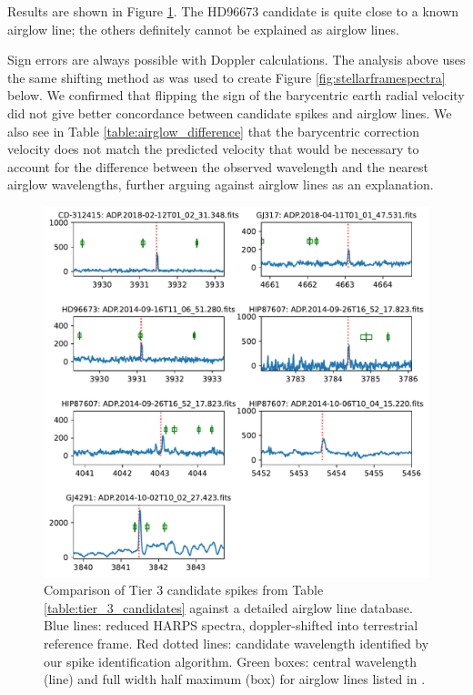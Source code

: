 \documentclass[twocolumn]{aastex701}
\begin{document}
Results are shown in Figure \ref{fig:airglow_reanalysis}. The HD96673 candidate is quite close to a known airglow line; the others definitely cannot be explained as airglow lines.

Sign errors are always possible with Doppler calculations.  The analysis above uses the same shifting method as was used to create Figure \ref{fig:stellarframespectra} below.  We confirmed that flipping the sign of the barycentric earth radial velocity did not give better concordance between candidate spikes and airglow lines. We also see in Table \ref{table:airglow_difference} that the barycentric correction velocity does not match the predicted velocity that would be necessary to account for the difference between the observed wavelength and the nearest airglow wavelengths, further arguing against airglow lines as an explanation.

\begin{figure}
    \centering  \includegraphics[width=\textwidth]{airglow_reanalysis.pdf}
    \caption{Comparison of Tier 3 candidate spikes from Table \ref{table:tier_3_candidates} against a detailed airglow line database.  Blue lines: reduced HARPS spectra, doppler-shifted into terrestrial reference frame.  Red dotted lines: candidate wavelength identified by our spike identification algorithm. Green boxes: central wavelength (line) and full width half maximum (box) for airglow lines listed in  \cite{faint_airglow_database}.}
    \label{fig:airglow_reanalysis}
\end{figure}
\end{document}
